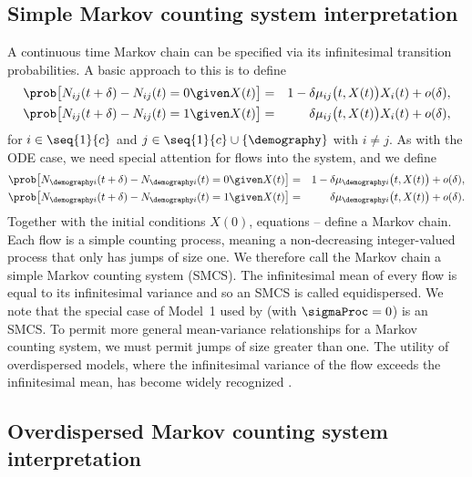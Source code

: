 \subsection{Simple Markov counting system interpretation}
\label{subsec:smcs}
A continuous time Markov chain can be specified via its infinitesimal transition probabilities.
A basic approach to this is to define
\begin{eqnarray}
\label{eq:smcs1}
\prob\big[ N_{ij}(t+\delta)-N_{ij}(t)=0 \given X(t)\big]
 &=& 1-\delta \mu_{ij}\big(t,X(t)\big)X_i(t) + o(\delta),
\\
\label{eq:smcs2}
\prob\big[ N_{ij}(t+\delta)-N_{ij}(t)=1 \given X(t)\big]
 &=& \delta \mu_{ij}\big(t,X(t)\big)X_i(t) + o(\delta),
\end{eqnarray}
for $i\in \seq{1}{c}$ and $j\in\seq{1}{c}\cup\{\demography\}$ with $i\neq j$.
As with the ODE case, we need special attention for flows into the system, and we define
\begin{eqnarray}
\label{eq:smcs3}
\prob\big[ N_{\demography i}(t+\delta)-N_{\demography i}(t)=0 \given X(t)\big]
 &=& 1-\delta \mu_{\demography i}\big(t,X(t)\big) + o(\delta),
\\
\label{eq:smcs4}
\prob\big[ N_{\demography i}(t+\delta)-N_{\demography i}(t)=1 \given X(t)\big]
 &=& \delta \mu_{\demography i}\big(t,X(t)\big) + o(\delta).
\end{eqnarray}
Together with the initial conditions $X(0)$, equations -- define a Markov chain.
Each flow is a simple counting process, meaning a non-decreasing integer-valued process that only has jumps of size one.
We therefore call the Markov chain a simple Markov counting system (SMCS).
The infinitesimal mean of every flow is equal to its infinitesimal variance \citep{breto11} and so an SMCS is called equidispersed.
We note that the special case of Model~1 used by \cite{lee20} (with $\sigmaProc = 0$) is an SMCS.
To permit more general mean-variance relationships for a Markov counting system, we must permit jumps of size greater than one.
The utility of overdispersed models, where the infinitesimal variance of the flow exceeds the infinitesimal mean, has become widely recognized \citep{stocks20,he10}.

\subsection{Overdispersed Markov counting system interpretation}
\label{subsec:odmcs}

